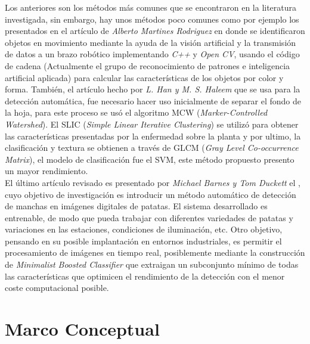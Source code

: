 	Los anteriores son los métodos más comunes que se encontraron en la literatura investigada, sin embargo, hay unos métodos poco comunes como por ejemplo los presentados en el artículo de \textit{Alberto Martines Rodriguez} \cite{article5} en donde se identificaron objetos en movimiento mediante la ayuda de la visión artificial y la transmisión de datos a un brazo robótico implementando \textit{C++} y \textit{Open CV}, usando el código de cadena (Actualmente el grupo de reconocimiento de patrones e inteligencia artificial aplicada) para calcular las características de los objetos por color y forma. También, el artículo hecho por \textit{L. Han y M. S. Haleem} \cite{7237209} que se usa para la detección automática, fue necesario hacer uso inicialmente de separar el fondo de la hoja, para este proceso se usó el algoritmo MCW (\textit{Marker-Controlled Watershed}). El SLIC (\textit{Simple Linear Iterative Clustering}) se utilizó para obtener las características presentadas por la enfermedad sobre la planta y por ultimo, la clasificación y textura se obtienen a través de GLCM (\textit{Gray Level Co-occurrence Matrix}), el modelo de clasificación fue el SVM, este método propuesto presento un mayor rendimiento.\\
	
	El último artículo revisado es presentado por \textit{Michael Barnes y Tom Duckett} el \cite{Barnes2010}, cuyo objetivo de  investigación es introducir un método automático de detección de manchas en imágenes digitales de patatas. El sistema desarrollado es entrenable, de modo que pueda trabajar con diferentes variedades de patatas y variaciones en las estaciones, condiciones de iluminación, etc. Otro objetivo, pensando en su posible implantación en entornos industriales, es permitir el procesamiento de imágenes en tiempo real, posiblemente mediante la construcción de \textit{Minimalist Boosted Classifier} que extraigan un subconjunto mínimo de todas las características que optimicen el rendimiento de la detección con el menor coste computacional posible.


\chapter{Marco Conceptual}

